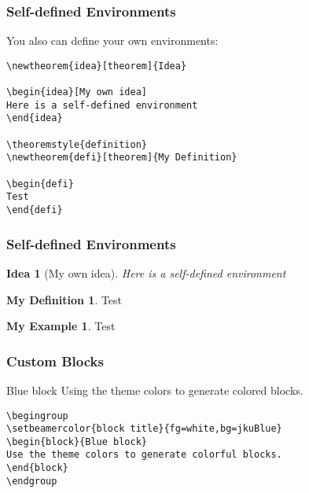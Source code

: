 \documentclass[utf8,aspectratio=169,ngerman,english]{beamer}
\begin{document}
\begin{frame}[fragile]
\frametitle{Self-defined Environments}

You also can define your own environments:
\begin{lstlisting}[language={[LaTeX]TeX},numbers=none]
\newtheorem{idea}[theorem]{Idea}

\begin{idea}[My own idea]
Here is a self-defined environment
\end{idea}

\theoremstyle{definition}
\newtheorem{defi}[theorem]{My Definition}

\begin{defi}
Test
\end{defi}
\end{lstlisting}
\end{frame}

\newtheorem{idea}[theorem]{Idea}
\theoremstyle{definition}
\newtheorem{defi}[theorem]{My Definition}
\theoremstyle{example}
\newtheorem{ex}[theorem]{My Example}

\begin{frame}[fragile]
\frametitle{Self-defined Environments}

\begin{idea}[My own idea]
Here is a self-defined environment
\end{idea}

\begin{defi}
Test
\end{defi}

\begin{ex}
Test
\end{ex}
\end{frame}


\begin{frame}[fragile]
\frametitle{Custom Blocks}
\begingroup
{}
\begin{block}{Blue block}
Using the theme colors to generate colored blocks.
\end{block}
\endgroup

\begin{lstlisting}[language={[LaTeX]TeX},numbers=none]
\begingroup
\setbeamercolor{block title}{fg=white,bg=jkuBlue}
\begin{block}{Blue block}
Use the theme colors to generate colorful blocks.
\end{block}
\endgroup
\end{lstlisting}
\end{frame}
\end{document}
